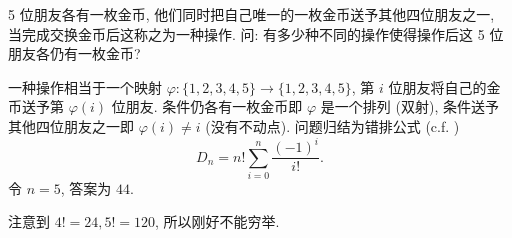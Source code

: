 \begin{prob}
\label{prob:prob-1}
5 位朋友各有一枚金币, 他们同时把自己唯一的一枚金币送予其他四位朋友之一,
当完成交换金币后这称之为一种操作.
问: 有多少种不同的操作使得操作后这 5 位朋友各仍有一枚金币?
\end{prob}

\begin{soln}
一种操作相当于一个映射
$\varphi: \{1,2,3,4,5\} \to \{1,2,3,4,5\}$,
第 $i$ 位朋友将自己的金币送予第 $\varphi(i)$ 位朋友.
条件仍各有一枚金币即 $\varphi$ 是一个排列 (双射),
条件送予其他四位朋友之一即 $\varphi(i) \ne i$ (没有不动点).
问题归结为错排公式 (c.f. \cite{derangement})
\[
D_n = n!\sum_{i=0}^n \frac{(-1)^i}{i!}.
\]
令 $n = 5$, 答案为 $\boxed{44.}$
\end{soln}

\begin{rem*}
注意到 $4! = 24, 5! = 120$, 所以刚好不能穷举.
\end{rem*}
